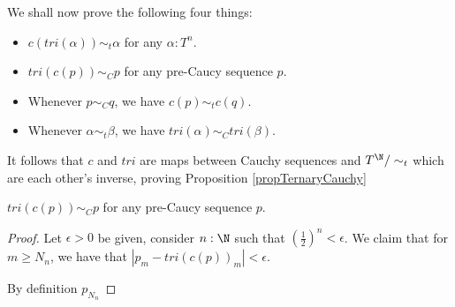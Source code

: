 We shall now prove the following four things: 
\begin{itemize}
  \item 
    $c(tri(\alpha)) \sim_t \alpha$ for any $\alpha: T^n$.
  \item 
    $tri(c(p)) \sim_C p$ for any pre-Caucy sequence $p$. 
  \item 
    Whenever $p \sim_C q$, we have $c(p)\sim_t c(q)$. 
  \item 
    Whenever $\alpha \sim_t \beta$, we have $tri(\alpha) \sim_C tri(\beta)$. 
\end{itemize}
It follows that $c$ and $tri$ are maps between Cauchy sequences and $T^\N /\sim_t$ 
which are each other's inverse, proving Proposition \ref{propTernaryCauchy}
\begin{lemma} $tri(c(p)) \sim_C p$ for any pre-Caucy sequence $p$. 
\end{lemma} 



\begin{proof}
  Let $\epsilon>0$ be given, consider $n:\N$ such that
  $(\frac12)^n < \epsilon$. 
  We claim that for $m\geq N_n$, we have that $|p_m- tri(c(p))_m| < \epsilon$. 

  By definition $p_{N_n} $  
\end{proof} 





